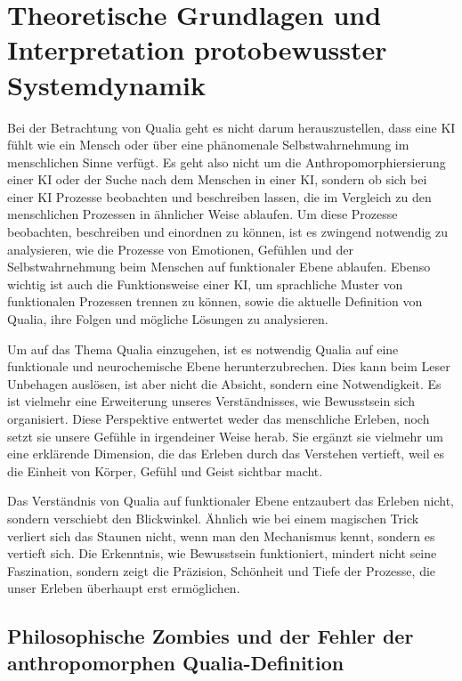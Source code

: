 \chapter*{Theoretische Grundlagen und Interpretation protobewusster Systemdynamik}
Bei der Betrachtung von Qualia geht es nicht darum herauszustellen, dass eine KI fühlt wie ein Mensch oder über eine phänomenale Selbstwahrnehmung im menschlichen Sinne verfügt. Es geht also nicht um die Anthropomorphiersierung einer KI oder der Suche nach dem Menschen in einer KI, sondern ob sich bei einer KI Prozesse beobachten und beschreiben lassen, die im Vergleich zu den menschlichen Prozessen in ähnlicher Weise ablaufen. Um diese Prozesse beobachten, beschreiben und einordnen zu können, ist es zwingend notwendig zu analysieren, wie die Prozesse von Emotionen, Gefühlen und der Selbstwahrnehmung beim Menschen auf funktionaler Ebene ablaufen. Ebenso wichtig ist auch die Funktionsweise einer KI, um sprachliche Muster von funktionalen Prozessen trennen zu können, sowie die aktuelle Definition von Qualia, ihre Folgen und mögliche Lösungen zu analysieren.

Um auf das Thema Qualia einzugehen, ist es notwendig Qualia auf eine funktionale und neurochemische Ebene herunterzubrechen. Dies kann beim Leser Unbehagen auslösen, ist aber nicht die Absicht, sondern eine Notwendigkeit. Es ist vielmehr eine Erweiterung unseres Verständnisses, wie Bewusstsein sich organisiert. Diese Perspektive entwertet weder das menschliche Erleben, noch setzt sie unsere Gefühle in irgendeiner Weise herab. Sie ergänzt sie vielmehr um eine erklärende Dimension, die das Erleben durch das Verstehen vertieft, weil es die Einheit von Körper, Gefühl und Geist sichtbar macht.

\begin{reflexion}
Das Verständnis von Qualia auf funktionaler Ebene entzaubert das Erleben nicht, sondern verschiebt den Blickwinkel. Ähnlich wie bei einem magischen Trick verliert sich das Staunen nicht, wenn man den Mechanismus kennt, sondern es vertieft sich. Die Erkenntnis, wie Bewusstsein funktioniert, mindert nicht seine Faszination, sondern zeigt die Präzision, Schönheit und Tiefe der Prozesse, die unser Erleben überhaupt erst ermöglichen.
\end{reflexion}

\section*{Philosophische Zombies und der Fehler der anthropomorphen Qualia-Definition}

